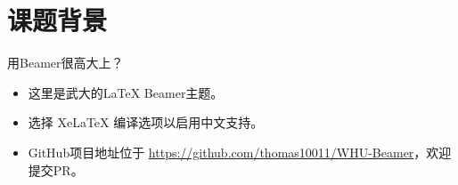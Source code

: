 \section{课题背景}

\begin{frame}{用Beamer很高大上？}
    \begin{itemize}[<+-| alert@+>] %
        \item 这里是武大的\LaTeX\; Beamer主题。
        \item 选择 Xe\LaTeX{} 编译选项以启用中文支持。
        \item GitHub项目地址位于 \url{https://github.com/thomas10011/WHU-Beamer}\cite{WHU-Beamer}，欢迎提交PR。
    \end{itemize}
\end{frame}


